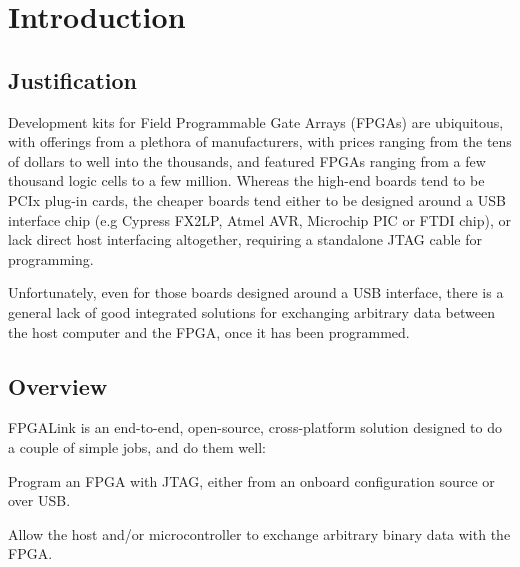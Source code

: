 



\vspace*{2cm}

\newpage
\tableofcontents

\newpage
\section{Introduction}
\subsection{Justification}
Development kits for Field Programmable Gate Arrays (FPGAs) are ubiquitous, with offerings from a plethora of manufacturers, with prices ranging from the tens of dollars to well into the thousands, and featured FPGAs ranging from a few thousand logic cells to a few million. Whereas the high-end boards tend to be PCIx plug-in cards, the cheaper boards tend either to be designed around a USB interface chip (e.g Cypress FX2LP, Atmel AVR, Microchip PIC or FTDI chip), or lack direct host interfacing altogether, requiring a standalone JTAG cable for programming.

Unfortunately, even for those boards designed around a USB interface, there is a general lack of good integrated solutions for exchanging arbitrary data between the host computer and the FPGA, once it has been programmed.

\subsection{Overview}
FPGALink is an end-to-end, open-source, cross-platform solution designed to do a couple of simple jobs, and do them well:

\begin{blobs}
  \item
    Program an FPGA with JTAG, either from an onboard configuration source or over USB.
  \item
    Allow the host and/or microcontroller to exchange arbitrary binary data with the FPGA.
\end{blobs}

